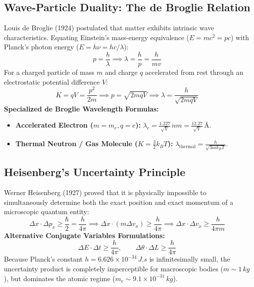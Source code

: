 \documentclass[10pt,twoside,openright]{book}
\begin{document}
\subsection{Wave-Particle Duality: The de Broglie Relation}
Louis de Broglie (1924) postulated that matter exhibits intrinsic wave characteristics. Equating Einstein's mass-energy equivalence ($E = mc^2 = pc$) with Planck's photon energy ($E = h\nu = hc/\lambda$):
\begin{equation}
  p = \frac{h}{\lambda} \implies \lambda = \frac{h}{p} = \frac{h}{m v}
\end{equation}
For a charged particle of mass $m$ and charge $q$ accelerated from rest through an electrostatic potential difference $V$:
\begin{equation}
  K = q V = \frac{p^2}{2m} \implies p = \sqrt{2m q V} \implies \lambda = \frac{h}{\sqrt{2m q V}}
\end{equation}
\textbf{Specialized de Broglie Wavelength Formulas:}
\begin{itemize}
  \item \textbf{Accelerated Electron ($m = m_e, q = e$):} $\lambda_e = \frac{1.227}{\sqrt{V}}\,\si{nm} = \frac{12.27}{\sqrt{V}}\,\text{\AA}$.
  \item \textbf{Thermal Neutron / Gas Molecule ($K = \frac{3}{2}k_B T$):} $\lambda_{\text{thermal}} = \frac{h}{\sqrt{3 m k_B T}}$.
\end{itemize}

\subsection{Heisenberg's Uncertainty Principle}
Werner Heisenberg (1927) proved that it is physically impossible to simultaneously determine both the exact position and exact momentum of a microscopic quantum entity:
\begin{equation}
  \Delta x \cdot \Delta p_x \ge \frac{\hbar}{2} = \frac{h}{4\pi} \implies \Delta x \cdot (m \Delta v_x) \ge \frac{h}{4\pi} \implies \Delta x \cdot \Delta v_x \ge \frac{h}{4\pi m}
\end{equation}
\textbf{Alternative Conjugate Variables Formulations:}
\begin{equation}
  \Delta E \cdot \Delta t \ge \frac{h}{4\pi}, \qquad \Delta \theta \cdot \Delta L \ge \frac{h}{4\pi}
\end{equation}
Because Planck's constant $h = 6.626 \times 10^{-34}\,\si{J.s}$ is infinitesimally small, the uncertainty product is completely imperceptible for macroscopic bodies ($m \sim 1\,\si{kg}$), but dominates the atomic regime ($m_e \sim 9.1 \times 10^{-31}\,\si{kg}$).
\end{document}
